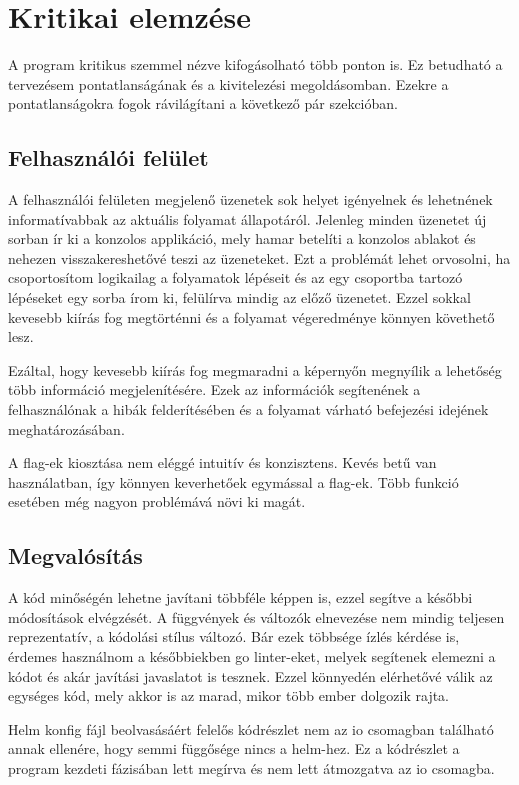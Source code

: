 \section{Kritikai elemzése}
A program kritikus szemmel nézve kifogásolható több ponton is.
Ez betudható a tervezésem pontatlanságának és a kivitelezési megoldásomban.
Ezekre a pontatlanságokra fogok rávilágítani a következő pár szekcióban.

\subsection*{Felhasználói felület}
A felhasználói felületen megjelenő üzenetek sok helyet igényelnek és lehetnének informatívabbak az aktuális folyamat állapotáról.
Jelenleg minden üzenetet új sorban ír ki a konzolos applikáció, mely hamar betelíti a konzolos ablakot és nehezen visszakereshetővé teszi az üzeneteket.
Ezt a problémát lehet orvosolni, ha csoportosítom logikailag a folyamatok lépéseit és az egy csoportba tartozó lépéseket egy sorba írom ki, felülírva mindig az előző üzenetet. Ezzel sokkal kevesebb kiírás fog megtörténni és a folyamat végeredménye könnyen követhető lesz.

Ezáltal, hogy kevesebb kiírás fog megmaradni a képernyőn megnyílik a lehetőség több információ megjelenítésére.
Ezek az információk segítenének a felhasználónak a hibák felderítésében és a folyamat várható befejezési idejének meghatározásában.

A flag-ek kiosztása nem eléggé intuitív és konzisztens. Kevés betű van használatban, így könnyen keverhetőek egymással a flag-ek.
Több funkció esetében még nagyon problémává növi ki magát.

\subsection*{Megvalósítás}
A kód minőségén lehetne javítani többféle képpen is, ezzel segítve a későbbi módosítások elvégzését.
A függvények és változók elnevezése nem mindig teljesen reprezentatív, a kódolási stílus változó.
Bár ezek többsége ízlés kérdése is, érdemes használnom a későbbiekben go linter-eket, melyek segítenek elemezni a kódot és akár javítási javaslatot is tesznek. Ezzel könnyedén elérhetővé válik az egységes kód, mely akkor is az marad, mikor több ember dolgozik rajta. 

Helm konfig fájl beolvasásáért felelős kódrészlet nem az io csomagban található annak ellenére, hogy semmi függősége nincs a helm-hez.
Ez a kódrészlet a program kezdeti fázisában lett megírva és nem lett átmozgatva az io csomagba.

